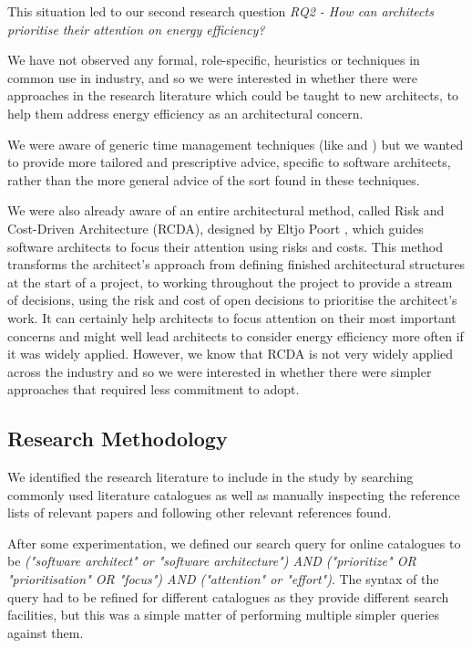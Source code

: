 This situation led to our second research question \emph{RQ2 - How can architects prioritise their attention on energy efficiency?}

We have not observed any formal, role-specific, heuristics or techniques in common use in industry, and so we were interested in whether there were approaches in the research literature which could be taught to new architects, to help them address energy efficiency as an architectural concern.  

We were aware of generic time management techniques (like \cite{allen2015-gettingthingsdone} and \cite{koch1998-8020principle}) but we wanted to provide more tailored and prescriptive advice, specific to software architects, rather than the more general advice of the sort found in these techniques.

We were also already aware of an entire architectural method, called Risk and Cost-Driven Architecture (RCDA), designed by Eltjo Poort \cite{poort2012-rcda}, which guides software architects to focus their attention using risks and costs.  This method transforms the architect's approach from defining finished architectural structures at the start of a project, to working throughout the project to provide a stream of decisions, using the risk and cost of open decisions to prioritise the architect's work. It can certainly help architects to focus attention on their most important concerns and might well lead architects to consider energy efficiency more often if it was widely applied.  However, we know that RCDA is not very widely applied across the industry and so we were interested in whether there were simpler approaches that required less commitment to adopt.

\subsection{Research Methodology}

We identified the research literature to include in the study by searching commonly used literature catalogues as well as manually inspecting the reference lists of relevant papers and following other relevant references found.

After some experimentation, we defined our search query for online catalogues to be \emph{("software architect" or "software architecture") AND ("prioritize" OR "prioritisation" OR "focus") AND ("attention" or "effort")}.  The syntax of the query had to be refined for different catalogues as they provide different search facilities, but this was a simple matter of performing multiple simpler queries against them.

